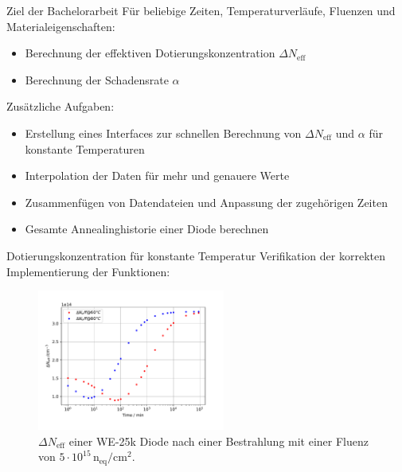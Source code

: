\documentclass[aspectratio=43, 10pt]{beamer}
\begin{document}
\begin{frame}{Ziel der Bachelorarbeit}
  Für beliebige Zeiten, Temperaturverläufe, Fluenzen und Materialeigenschaften:
  \begin{itemize}
    \item Berechnung der effektiven Dotierungskonzentration $\Delta N_{\mathrm{eff}}$
    \item Berechnung der Schadensrate $\alpha$
  \end{itemize}
  \medskip

  Zusätzliche Aufgaben:
  \begin{itemize}
    \item Erstellung eines Interfaces zur schnellen Berechnung von $\Delta N_{\mathrm{eff}}$ und $\alpha$
    für konstante Temperaturen
    \item Interpolation der Daten für mehr und genauere Werte
    \item Zusammenfügen von Datendateien und Anpassung der zugehörigen Zeiten
    \item Gesamte Annealinghistorie einer Diode berechnen
  \end{itemize}
\end{frame}

\begin{frame}{Dotierungskonzentration für konstante Temperatur}
  Verifikation der korrekten Implementierung der Funktionen:
  \begin{figure}
      \includegraphics[width=0.55\textwidth]{images/annealing.PDF}
  \caption{$\Delta N_{\mathrm{eff}}$ einer WE-25k Diode nach einer Bestrahlung mit einer Fluenz von
    $5\cdot 10^{15} \, \mathrm{n_{\mathrm{eq}}/cm^2}$.}
  \end{figure}
\end{frame}
\end{document}
